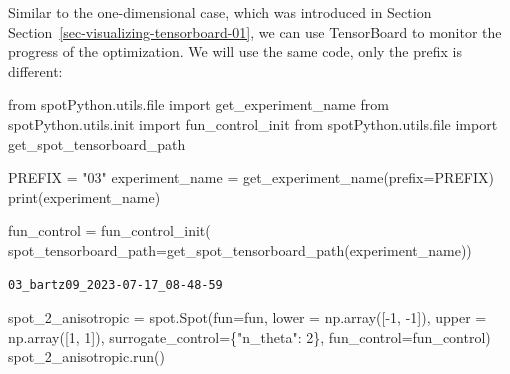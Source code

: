 \documentclass[
  letterpaper,
  DIV=11,
  numbers=noendperiod]{scrreprt}
\newenvironment{Shaded}{\begin{snugshade}}{\end{snugshade}}
\newcommand{\BuiltInTok}[1]{\textcolor[rgb]{0.00,0.23,0.31}{#1}}
\newcommand{\DecValTok}[1]{\textcolor[rgb]{0.68,0.00,0.00}{#1}}
\newcommand{\ImportTok}[1]{\textcolor[rgb]{0.00,0.46,0.62}{#1}}
\newcommand{\NormalTok}[1]{\textcolor[rgb]{0.00,0.23,0.31}{#1}}
\newcommand{\OperatorTok}[1]{\textcolor[rgb]{0.37,0.37,0.37}{#1}}
\newcommand{\StringTok}[1]{\textcolor[rgb]{0.13,0.47,0.30}{#1}}
\begin{document}
\begin{tcolorbox}[enhanced jigsaw, left=2mm, title=\textcolor{quarto-callout-note-color}{\faInfo}\hspace{0.5em}{TensorBoard}, bottomrule=.15mm, titlerule=0mm, breakable, rightrule=.15mm, toprule=.15mm, coltitle=black, colbacktitle=quarto-callout-note-color!10!white, leftrule=.75mm, arc=.35mm, colframe=quarto-callout-note-color-frame, bottomtitle=1mm, colback=white, opacitybacktitle=0.6, toptitle=1mm, opacityback=0]

Similar to the one-dimensional case, which was introduced in Section
Section~\ref{sec-visualizing-tensorboard-01}, we can use TensorBoard to
monitor the progress of the optimization. We will use the same code,
only the prefix is different:

\begin{Shaded}
\begin{Highlighting}[]
\ImportTok{from}\NormalTok{ spotPython.utils.}\BuiltInTok{file} \ImportTok{import}\NormalTok{ get\_experiment\_name}
\ImportTok{from}\NormalTok{ spotPython.utils.init }\ImportTok{import}\NormalTok{ fun\_control\_init}
\ImportTok{from}\NormalTok{ spotPython.utils.}\BuiltInTok{file} \ImportTok{import}\NormalTok{ get\_spot\_tensorboard\_path}

\NormalTok{PREFIX }\OperatorTok{=} \StringTok{"03"}
\NormalTok{experiment\_name }\OperatorTok{=}\NormalTok{ get\_experiment\_name(prefix}\OperatorTok{=}\NormalTok{PREFIX)}
\BuiltInTok{print}\NormalTok{(experiment\_name)}

\NormalTok{fun\_control }\OperatorTok{=}\NormalTok{ fun\_control\_init(}
\NormalTok{    spot\_tensorboard\_path}\OperatorTok{=}\NormalTok{get\_spot\_tensorboard\_path(experiment\_name))}
\end{Highlighting}
\end{Shaded}

\begin{verbatim}
03_bartz09_2023-07-17_08-48-59
\end{verbatim}

\end{tcolorbox}

\begin{Shaded}
\begin{Highlighting}[]
\NormalTok{spot\_2\_anisotropic }\OperatorTok{=}\NormalTok{ spot.Spot(fun}\OperatorTok{=}\NormalTok{fun,}
\NormalTok{                   lower }\OperatorTok{=}\NormalTok{ np.array([}\OperatorTok{{-}}\DecValTok{1}\NormalTok{, }\OperatorTok{{-}}\DecValTok{1}\NormalTok{]),}
\NormalTok{                   upper }\OperatorTok{=}\NormalTok{ np.array([}\DecValTok{1}\NormalTok{, }\DecValTok{1}\NormalTok{]),}
\NormalTok{                   surrogate\_control}\OperatorTok{=}\NormalTok{\{}\StringTok{"n\_theta"}\NormalTok{: }\DecValTok{2}\NormalTok{\},}
\NormalTok{                   fun\_control}\OperatorTok{=}\NormalTok{fun\_control)}
\NormalTok{spot\_2\_anisotropic.run()}
\end{Highlighting}
\end{Shaded}
\end{document}
